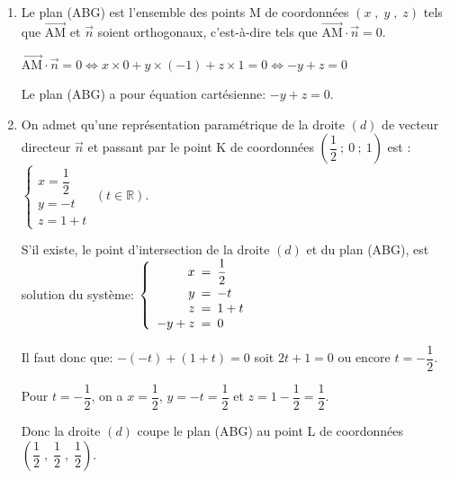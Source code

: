 \documentclass[10pt]{article}
\providecommand{\R}{\mathbb{R}}
\providecommand{\vect}[1]{\overrightarrow{#1}}
\providecommand{\vectt}[1]{\overrightarrow{\mathrm{#1}}}
\begin{document}
\begin{enumerate}
\begin{enumerate}

Le vecteur $\vect{n}$ est orthogonal à deux vecteurs directeurs du plan (ABG), donc $\vect{n}$ est un vecteur normal au plan (ABG).

		\item 
Le plan (ABG) est l'ensemble des points M de coordonnées $(x\;,\; y \;,\; z)$ tels que $\vectt{AM}$ et $\vect{n}$ soient orthogonaux, c'est-à-dire tels que $\vectt{AM}\cdot \vect{n}=0$.

$\vectt{AM}\cdot \vect{n}=0
\iff
x \times 0+ y\times (-1) +z\times 1 = 0
\iff
-y+z=0$

Le plan (ABG) a pour équation cartésienne: $-y+z=0$.

		\item On admet qu'une représentation paramétrique de la droite $(d)$ de vecteur directeur $\vect{n}$ et passant par le point K de coordonnées $\left(\dfrac{1}{2} ~;~ 0 ~;~ 1\right)$ est : $\left\{\begin{array}{l}
x=\dfrac{1}{2} \\[5pt]
 y= - t \\
  z=1+t \end{array} \right.\; (t \in \R).$



S'il existe, le point d'intersection de la droite $(d)$ et du plan (ABG), est solution du système:
$\left \{
\begin{array}{r !{=} l}
x & \dfrac{1}{2} \\[5pt]
y & -t\\
z & 1+t\\
-y+z & 0
\end{array}
\right .$

Il faut donc que: $-(-t)+(1+t)=0$ soit $2t+1=0$ ou encore $t=-\dfrac{1}{2}$.

Pour $t=-\dfrac{1}{2}$, on a $x=\dfrac{1}{2}$, $y=-t = \dfrac{1}{2}$ et $z= 1-\dfrac{1}{2}=\dfrac{1}{2}$.

Donc la droite $(d)$ coupe le plan (ABG) au point L de coordonnées $\left ( \dfrac{1}{2}\;,\; \dfrac{1}{2}\;,\; \dfrac{1}{2}\right )$.


\end{enumerate}
\end{enumerate}
\end{document}
